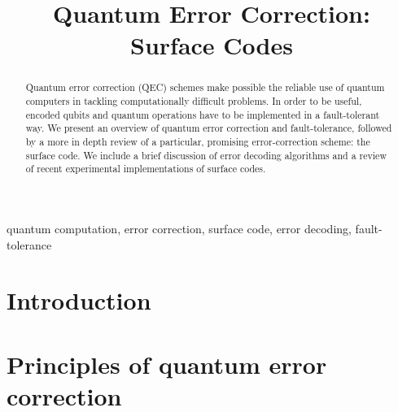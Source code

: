 \documentclass[conference]{IEEEtran}
\begin{document}
\title{Quantum Error Correction: Surface Codes}

\author{

  \and

}

\maketitle


\begin{abstract}
Quantum error correction (QEC) schemes make possible the reliable use of quantum computers in
tackling computationally difficult problems. In order to be useful, encoded
qubits and quantum operations have to be implemented in a fault-tolerant way. We
present an overview of quantum error correction and fault-tolerance, followed by
a more in depth review of a particular, promising error-correction scheme: the
surface code. We include a brief discussion of error decoding algorithms and a
review of recent experimental implementations of surface codes.
\end{abstract}

\begin{IEEEkeywords}
  quantum computation, error correction, surface code, error decoding, fault-tolerance
\end{IEEEkeywords}

\section{Introduction}


\section{Principles of quantum error correction}

\end{document}
